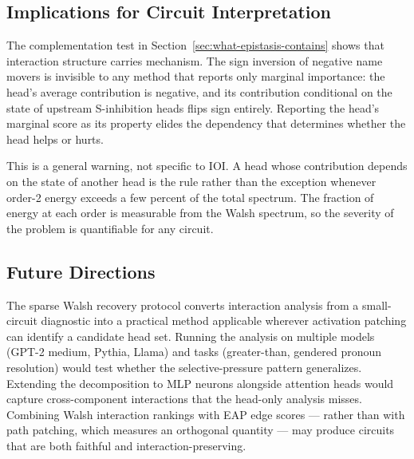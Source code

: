 \documentclass{article}
\begin{document}
\subsection{Implications for Circuit Interpretation}

The complementation test in
Section~\ref{sec:what-epistasis-contains} shows that interaction
structure carries mechanism. The sign inversion of negative name movers
is invisible to any method that reports only marginal importance: the
head's average contribution is negative, and its contribution
conditional on the state of upstream S-inhibition heads flips sign
entirely. Reporting the head's marginal score as its property elides
the dependency that determines whether the head helps or hurts.

This is a general warning, not specific to IOI. A head whose
contribution depends on the state of another head is the rule rather
than the exception whenever order-2 energy exceeds a few percent of
the total spectrum. The fraction of energy at each order is measurable
from the Walsh spectrum, so the severity of the problem is quantifiable
for any circuit.

\subsection{Future Directions}

The sparse Walsh recovery protocol converts interaction analysis from a
small-circuit diagnostic into a practical method applicable wherever
activation patching can identify a candidate head set. Running the
analysis on multiple models (GPT-2 medium, Pythia, Llama) and tasks
(greater-than, gendered pronoun resolution) would test whether the
selective-pressure pattern generalizes. Extending the decomposition to
MLP neurons alongside attention heads would capture cross-component
interactions that the head-only analysis misses. Combining Walsh
interaction rankings with EAP edge scores --- rather than with path
patching, which measures an orthogonal quantity --- may produce circuits
that are both faithful and interaction-preserving.
\end{document}
